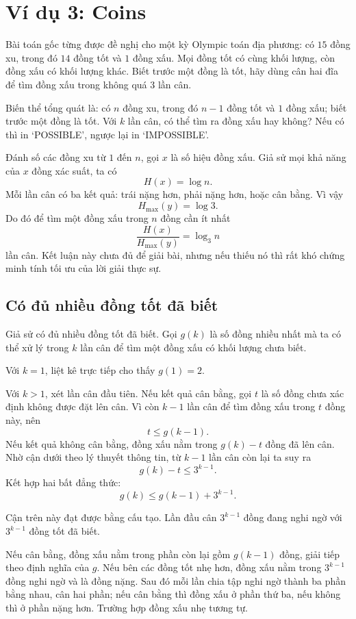 \documentclass[11pt]{article}
\begin{document}
\section{Ví dụ 3: Coins}

Bài toán gốc từng được đề nghị cho một kỳ Olympic toán địa phương: có \(15\)
đồng xu, trong đó \(14\) đồng tốt và \(1\) đồng xấu. Mọi đồng tốt có cùng khối
lượng, còn đồng xấu có khối lượng khác. Biết trước một đồng là tốt, hãy dùng
cân hai đĩa để tìm đồng xấu trong không quá \(3\) lần cân.

Biến thể tổng quát là: có \(n\) đồng xu, trong đó \(n-1\) đồng tốt và \(1\)
đồng xấu; biết trước một đồng là tốt. Với \(k\) lần cân, có thể tìm ra đồng
xấu hay không? Nếu có thì in `POSSIBLE', ngược lại in `IMPOSSIBLE'.

Đánh số các đồng xu từ \(1\) đến \(n\), gọi \(x\) là số hiệu đồng xấu. Giả sử
mọi khả năng của \(x\) đồng xác suất, ta có
\[
  H(x)=\log n.
\]
Mỗi lần cân có ba kết quả: trái nặng hơn, phải nặng hơn, hoặc cân bằng. Vì vậy
\[
  H_{\max}(y)=\log 3.
\]
Do đó để tìm một đồng xấu trong \(n\) đồng cần ít nhất
\[
  \frac{H(x)}{H_{\max}(y)}=\log_3 n
\]
lần cân. Kết luận này chưa đủ để giải bài, nhưng nếu thiếu nó thì rất khó
chứng minh tính tối ưu của lời giải thực sự.

\subsection{Có đủ nhiều đồng tốt đã biết}

Giả sử có đủ nhiều đồng tốt đã biết. Gọi \(g(k)\) là số đồng nhiều nhất mà ta
có thể xử lý trong \(k\) lần cân để tìm một đồng xấu có khối lượng chưa biết.

Với \(k=1\), liệt kê trực tiếp cho thấy \(g(1)=2\).

Với \(k>1\), xét lần cân đầu tiên. Nếu kết quả cân bằng, gọi \(t\) là số đồng
chưa xác định không được đặt lên cân. Vì còn \(k-1\) lần cân để tìm đồng xấu
trong \(t\) đồng này, nên
\[
  t\le g(k-1).
\]
Nếu kết quả không cân bằng, đồng xấu nằm trong \(g(k)-t\) đồng đã lên cân. Nhờ
cận dưới theo lý thuyết thông tin, từ \(k-1\) lần cân còn lại ta suy ra
\[
  g(k)-t\le 3^{k-1}.
\]
Kết hợp hai bất đẳng thức:
\[
  g(k)\le g(k-1)+3^{k-1}.
\]

Cận trên này đạt được bằng cấu tạo. Lần đầu cân \(3^{k-1}\) đồng đang nghi
ngờ với \(3^{k-1}\) đồng tốt đã biết.

Nếu cân bằng, đồng xấu nằm trong phần còn lại gồm \(g(k-1)\) đồng, giải tiếp
theo định nghĩa của \(g\). Nếu bên các đồng tốt nhẹ hơn, đồng xấu nằm trong
\(3^{k-1}\) đồng nghi ngờ và là đồng nặng. Sau đó mỗi lần chia tập nghi ngờ
thành ba phần bằng nhau, cân hai phần; nếu cân bằng thì đồng xấu ở phần thứ
ba, nếu không thì ở phần nặng hơn. Trường hợp đồng xấu nhẹ tương tự.
\end{document}
